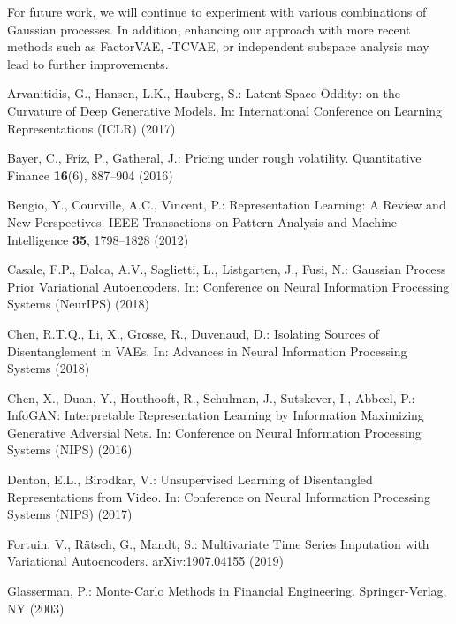 \documentclass[runningheads]{llncs}
\begin{document}
   For future work, we will continue to experiment with various combinations of Gaussian processes. In addition, enhancing our approach with more recent methods such as FactorVAE, -TCVAE, or independent subspace analysis  \cite{Stuehmer2020} may lead to further improvements. 

  	
\begin{thebibliography}{10}
	\providecommand{\url}[1]{\texttt{#1}}
	\providecommand{\urlprefix}{URL }
	\providecommand{\doi}[1]{https://doi.org/#1}
	
	Arvanitidis, G., Hansen, L.K., Hauberg, S.: Latent {S}pace {O}ddity: on the
	{C}urvature of {D}eep {G}enerative {M}odels. In: International Conference on
	Learning Representations (ICLR) (2017)
	
	Bayer, C., Friz, P., Gatheral, J.: Pricing under rough volatility. Quantitative
	Finance  \textbf{16}(6),  887--904 (2016)
	
	Bengio, Y., Courville, A.C., Vincent, P.: Representation {L}earning: {A}
	{R}eview and {N}ew {P}erspectives. IEEE Transactions on Pattern Analysis and
	Machine Intelligence  \textbf{35},  1798--1828 (2012)
	
	Casale, F.P., Dalca, A.V., Saglietti, L., Listgarten, J., Fusi, N.: Gaussian
	{P}rocess {P}rior {V}ariational {A}utoencoders. In: Conference on Neural
	Information Processing Systems (NeurIPS) (2018)
	
	Chen, R.T.Q., Li, X., Grosse, R., Duvenaud, D.: Isolating {S}ources of
	{D}isentanglement in {VAE}s. In: Advances in Neural Information Processing
	Systems (2018)
	
	Chen, X., Duan, Y., Houthooft, R., Schulman, J., Sutskever, I., Abbeel, P.:
	Info{GAN}: {I}nterpretable {R}epresentation {L}earning by {I}nformation
	{M}aximizing {G}enerative {A}dversial {N}ets. In: Conference on Neural
	Information Processing Systems (NIPS) (2016)
	
	Denton, E.L., Birodkar, V.: Unsupervised {L}earning of {D}isentangled
	{R}epresentations from {V}ideo. In: Conference on Neural Information
	Processing Systems (NIPS) (2017)
	
	Fortuin, V., R{\"a}tsch, G., Mandt, S.: Multivariate {T}ime {S}eries
	{I}mputation with {V}ariational {A}utoencoders. arXiv:1907.04155  (2019)
	
	Glasserman, P.: Monte-{C}arlo {M}ethods in {F}inancial {E}ngineering.
	Springer-Verlag, NY (2003)
	

\end{thebibliography}
\end{document}
